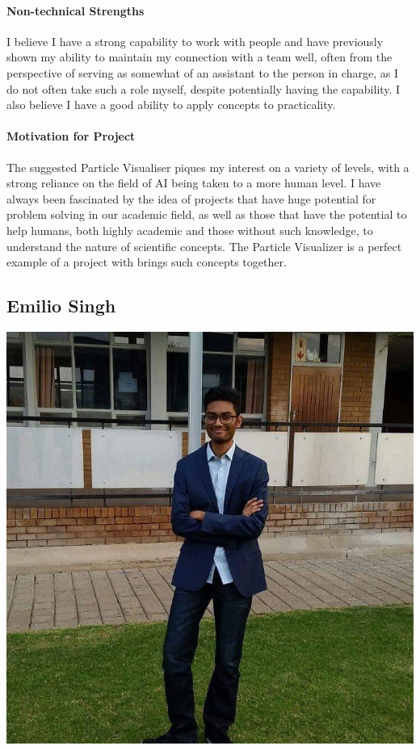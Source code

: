 \documentclass[12pt]{article}
\begin{document}
\paragraph{Non-technical Strengths}
I believe I have a strong capability to work with people and have previously shown my ability to maintain my connection with a team well, often from the perspective of serving as somewhat of an assistant to the person in charge, as I do not often take such a role myself, despite potentially having the capability. 
\newline I also believe I have a good ability to apply concepts to practicality.
\paragraph{Motivation for Project}
The suggested Particle Visualiser piques my interest on a variety of levels, with a strong reliance on the field of AI being taken to a more human level. I have always been fascinated by the idea of projects that have huge potential for problem solving in our academic field, as well as those that have the potential to help humans, both highly academic and those without such knowledge, to understand the nature of scientific concepts. The Particle Visualizer is a perfect example of a project with brings such concepts together.

\subsection{Emilio Singh}
\includegraphics[scale=0.2]{Emilio}
\end{document}
